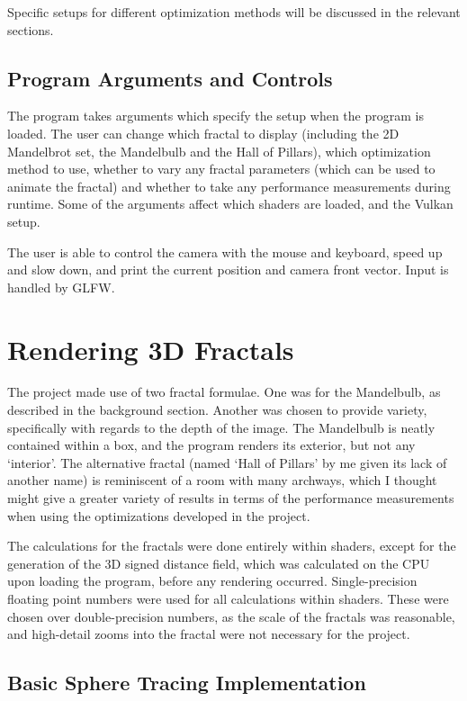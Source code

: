 Specific setups for different optimization methods will be discussed in the relevant sections.

\subsection{Program Arguments and Controls}

The program takes arguments which specify the setup when the program is loaded. The user can change which fractal to display (including the 2D Mandelbrot set, the Mandelbulb and the Hall of Pillars), which optimization method to use, whether to vary any fractal parameters (which can be used to animate the fractal) and whether to take any performance measurements during runtime. Some of the arguments affect which shaders are loaded, and the Vulkan setup.\newline

The user is able to control the camera with the mouse and keyboard, speed up and slow down, and print the current position and camera front vector. Input is handled by GLFW.

\section{Rendering 3D Fractals}

The project made use of two fractal formulae. One was for the Mandelbulb, as described in the background section. Another was chosen to provide variety, specifically with regards to the depth of the image. The Mandelbulb is neatly contained within a box, and the program renders its exterior, but not any `interior'. The alternative fractal (named `Hall of Pillars' by me given its lack of another name) is reminiscent of a room with many archways, which I thought might give a greater variety of results in terms of the performance measurements when using the optimizations developed in the project.\newline

The calculations for the fractals were done entirely within shaders, except for the generation of the 3D signed distance field, which was calculated on the CPU upon loading the program, before any rendering occurred. Single-precision floating point numbers were used for all calculations within shaders. These were chosen over double-precision numbers, as the scale of the fractals was reasonable, and high-detail zooms into the fractal were not necessary for the project.

\subsection{Basic Sphere Tracing Implementation}

